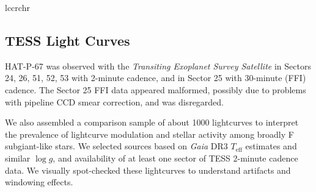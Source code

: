 \documentclass[twocolumn]{aastex631}
\begin{document}
\begin{deluxetable}{lccrchr}
    \tablewidth{0pc}
    \tabletypesize{\scriptsize}
    \startdata
    
    \enddata
\end{deluxetable}

\subsection{TESS Light Curves}
HAT-P-67 was observed with the \emph{Transiting Exoplanet Survey Satellite} \citep[TESS,][]{2014SPIE.9143E..20R} in Sectors 24, 26, 51, 52, 53 with 2-minute cadence, and in Sector 25 with 30-minute (FFI) cadence.  The Sector 25 FFI data appeared malformed, possibly due to problems with pipeline CCD smear correction, and was disregarded.

We also assembled a comparison sample of about 1000 lightcurves to interpret the prevalence of lightcurve modulation and stellar activity among broadly F subgiant-like stars.  We selected sources based on \emph{Gaia} DR3 $T_\mathrm{eff}$ estimates and similar $\log{g}$,  and availability of at least one sector of TESS 2-minute cadence data.  We visually spot-checked these lightcurves to understand artifacts and windowing effects.
\end{document}
